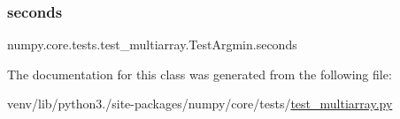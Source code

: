 \subsubsection{\texorpdfstring{seconds}{seconds}}
{\footnotesize\ttfamily numpy.\+core.\+tests.\+test\+\_\+multiarray.\+Test\+Argmin.\+seconds\hspace{0.3cm}{\ttfamily [static]}}



The documentation for this class was generated from the following file\+:\begin{DoxyCompactItemize}
\item 
venv/lib/python3./site-\/packages/numpy/core/tests/\hyperlink{core_2tests_2test__multiarray_8py}{test\+\_\+multiarray.\+py}\end{DoxyCompactItemize}
